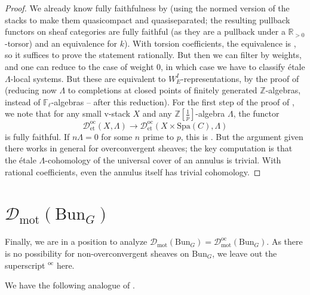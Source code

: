 \documentclass[11pt]{amsart}
\numberwithin{equation}{section}
\numberwithin{theorem}{section}
\theoremstyle{definition}
\newcommand{\Bun}{\mathrm{Bun}}
\begin{document}
\begin{proof} We already know fully faithfulness by \cite[Corollary 10.6]{BerkovichMotives} (using the normed version of the stacks to make them quasicompact and quasiseparated; the resulting pullback functors on sheaf categories are fully faithful (as they are a pullback under a $\mathbb R_{>0}$-torsor) and an equivalence for $k$). With torsion coefficients, the equivalence is \cite[Proposition IV.7.3]{FarguesScholze}, so it suffices to prove the statement rationally. But then we can filter by weights, and one can reduce to the case of weight $0$, in which case we have to classify \'etale $\Lambda$-local systems. But these are equivalent to $W_E^I$-representations, by the proof of \cite[Proposition IV.7.3]{FarguesScholze} (reducing now $\Lambda$ to completions at closed points of finitely generated $\mathbb Z$-algebras, instead of $\mathbb F_\ell$-algebras -- after this reduction). For the first step of the proof of \cite[Proposition IV.7.3]{FarguesScholze}, we note that for any small v-stack $X$ and any $\mathbb Z[\tfrac 1p]$-algebra $\Lambda$, the functor
\[
\mathcal D_{\mathrm{et}}^{\mathrm{oc}}(X,\Lambda)\to \mathcal D_{\mathrm{et}}^{\mathrm{oc}}(X\times \mathrm{Spa}(C),\Lambda)
\]
is fully faithful. If $n\Lambda=0$ for some $n$ prime to $p$, this is \cite[Theorem 19.5]{ECoD}. But the argument given there works in general for overconvergent sheaves; the key computation is that the \'etale $\Lambda$-cohomology of the universal cover of an annulus is trivial. With rational coefficients, even the annulus itself has trivial cohomology.
\end{proof}


\section{$\mathcal D_{\mathrm{mot}}(\Bun_G)$}

Finally, we are in a position to analyze $\mathcal D_{\mathrm{mot}}(\Bun_G) = \mathcal D_{\mathrm{mot}}^{\mathrm{oc}}(\Bun_G)$. As there is no possibility for non-overconvergent sheaves on $\Bun_G$, we leave out the superscript $^{\mathrm{oc}}$ here.

We have the following analogue of \cite[Theorem V.0.1]{FarguesScholze}.
\end{document}
